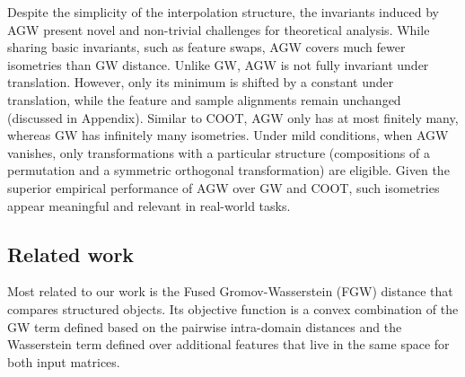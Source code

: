 Despite the simplicity of the interpolation structure, the invariants induced by AGW
present novel and non-trivial challenges for theoretical analysis.
While sharing basic invariants, such as feature swaps, AGW covers much fewer isometries than
GW distance. Unlike GW, AGW is not fully invariant under translation. However,
only its minimum is shifted by a constant under translation, while
the feature and sample alignments remain unchanged (discussed in Appendix).
Similar to COOT, AGW only has at most finitely many, whereas GW has infinitely many isometries.
Under mild conditions, when AGW vanishes, only transformations with a particular structure
(compositions of a permutation and a symmetric orthogonal transformation) are eligible.
Given the superior empirical performance of AGW over GW and COOT, such isometries appear
meaningful and relevant in real-world tasks.

\subsection{Related work}


Most related to our work is the Fused Gromov-Wasserstein (FGW) distance \citep{Vayer19b}
that compares structured objects. Its objective function is a convex combination of
the GW term defined based on the pairwise intra-domain distances and the Wasserstein term
defined over additional features that live in the same space for both input matrices.

